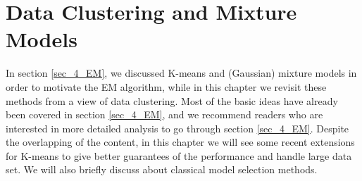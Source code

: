 \documentclass[../main.tex]{subfiles}
\begin{document}

\chapter{Data Clustering and Mixture Models}

In section \ref{sec_4_EM}, we discussed K-means and (Gaussian) mixture models in order to motivate the EM algorithm, while in this chapter we revisit these methods from a view of data clustering. Most of the basic ideas have already been covered in section \ref{sec_4_EM}, and we recommend readers who are interested in more detailed analysis to go through section \ref{sec_4_EM}. Despite the overlapping of the content, in this chapter we will see some recent extensions for K-means to give better guarantees of the performance and handle large data set. We will also briefly discuss about classical model selection methods.
\end{document}

